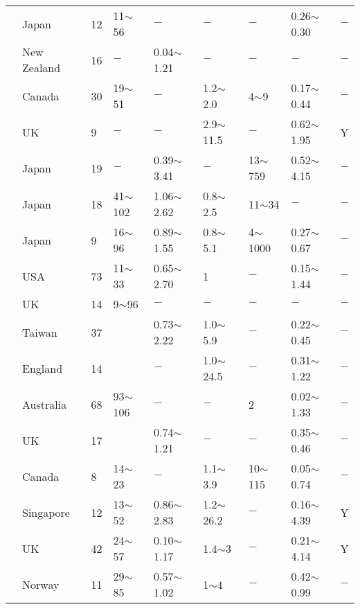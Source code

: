 {\begin{longtable}{lllllllll}
    \citet{Nakase198829} & Japan & 12    & 11$\sim$56 & $-$     & $-$     & $-$     & 0.26$\sim$0.30 & $-$ \\
    \citet{Newland195783} & New Zealand & 16    & $-$     & 0.04$\sim$1.21 & $-$     & $-$     & $-$     & $-$ \\
    \citet{Ng1985375} & Canada & 30    & 19$\sim$51 & $-$     & 1.2$\sim$2.0 & 4$\sim$9   & 0.17$\sim$0.44 & $-$ \\
    \citet{Niazi20109} & UK    & 9     & $-$     & $-$     & 2.9$\sim$11.5 & $-$     & 0.62$\sim$1.95 & Y \\
    \citet{Ohtsubo198271} & Japan & 19    & $-$     & 0.39$\sim$3.41 & $-$     & 13$\sim$759 & 0.52$\sim$4.15 & $-$ \\
    \citet{Ohtsubo1995509} & Japan & 18    & 41$\sim$102 & 1.06$\sim$2.62 & 0.8$\sim$2.5 & 11$\sim$34 & $-$     & $-$ \\
    \citet{Ohtsubo20071893} & Japan & 9     & 16$\sim$96 & 0.89$\sim$1.55 & 0.8$\sim$5.1 & 4$\sim$1000 & 0.27$\sim$0.67 & $-$ \\
    \citet{Olsen1986608} & USA   & 73    & 11$\sim$33 & 0.65$\sim$2.70 & 1     & $-$     & 0.15$\sim$1.44 & $-$ \\
    \citet{O'Riordan1982755} & UK    & 14    & 9$\sim$96  & $-$     & $-$     & $-$     & $-$     & $-$ \\
    \citet{Ou1994383} & Taiwan & 37    &       & 0.73$\sim$2.22 & 1.0$\sim$5.9 & $-$     & 0.22$\sim$0.45 & $-$ \\
    \citet{Parry1960166} & England & 14    &       & $-$     & 1.0$\sim$24.5 & $-$     & 0.31$\sim$1.22 & $-$ \\
    \citet{Parry1968151} & Australia & 68    & 93$\sim$106 & $-$     & $-$     & 2     & 0.02$\sim$1.33 & $-$ \\
    \citet{Parry1974345} & UK    & 17    &       & 0.74$\sim$1.21 & $-$     & $-$     & 0.35$\sim$0.46 & $-$ \\
    \citet{Parry1981309} & Canada & 8     & 14$\sim$23 & $-$     & 1.1$\sim$3.9 & 10$\sim$115 & 0.05$\sim$0.74 & $-$ \\
    \citet{Phoon2013} & Singapore & 12    & 13$\sim$52 & 0.86$\sim$2.83 & 1.2$\sim$26.2 & $-$     & 0.16$\sim$4.39 & Y \\
    \citet{Powell1988903} & UK    & 42    & 24$\sim$57 & 0.10$\sim$1.17 & 1.4$\sim$3 & $-$     & 0.21$\sim$4.14 & Y \\
    \citet{Prevost1977255} & Norway & 11    & 29$\sim$85 & 0.57$\sim$1.02 & 1$\sim$4   & $-$     & 0.42$\sim$0.99 & $-$ \\

\end{longtable}}
